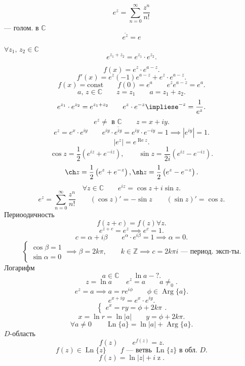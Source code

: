 \lec
\[
e^z= \sum_{n=0}^{\infty} \frac{z^n}{n!}
\]
--- голом. в $\mathbb{C}$
 \[
\overline{e^z}= e 
\]
\begin{thm}
	$\forall z_1,\, z_2 \in \mathbb{C}$ 
	\[
	e ^{z_1 + z_2}= e^{ z_1}\cdot e^{z_2}
	.\] 
\end{thm}
\[
	f(x)=e^{z}\cdot e^{a-z}
.\] 
\[
	f'(x)=e^{z}(-1) e^{a-z}+e^{z}\cdot e^{a-z}
.\] 
\[
	f(x)= \text{const} \qquad f(0)= e^a \qquad e^z e ^{a-z}=e^{a}
.\] 
\[
	a,\,z \in \mathbb{C} \qquad z=z_1 \qquad a=z_1+z_2
.\]
\[
e^{z_1} \cdot e^{z_2}= e ^{z_1 +z_2} \qquad e^{ z}\cdot e^{-z} \impliese ^{-z} = \frac{1}{e^{z}}
.\] 
\[
e^{z} \neq \text{ в } \mathbb{C} \qquad z=x+i y 
.\] 
\[
e ^{z}= e ^{ x} \cdot e ^{iy} \qquad e^{iy} \cdot \overline{e^{iy}}= e ^{iy} \cdot e  ^{-iy}=1 \implies |e ^{iy}|=1
.\] 
\[
	|e ^{z}|= e ^{\operatorname{Re} z}
.\] 
\[
	\cos z = \frac{1}{2} \left( e ^{iz}+ e ^{ -iz} \right) , \qquad \sin z = \frac{1}{2i} \left( e ^{iz}- e ^{-iz} \right) 
.\] 
\[
	\ch z= \frac{1}{2}\left( e ^{z}+e ^{-z} \right) , \sh z= \frac{1}{2}\left(e ^{z}- e^{-z}\right)
.\] 
\[
	\forall z \in \mathbb{C} \qquad e^{iz}= \cos z + i \sin z
.\] 
\[
	e^{z}= \sum_{n=0}^{\infty} \frac{z^n}{n!}\qquad (\cos z)'= -\sin z\qquad (\sin z )'= \cos z
.\] 
Периоодичность
\[
	f(z+c)= f(z) \forall z
.\] 
\[
e^{z+c}= e^{ z} \implies e ^{c}=1
.\] 
\[
c= \alpha +i \beta \qquad e ^{\alpha} \cdot e ^{i\beta}=1\implies \alpha=0
.\] 
\[
\left\{
\begin{aligned}
\cos \beta = 1 \\
\sin \alpha = 0
\end{aligned}
\right.\implies
\beta= 2 k \pi, \qquad k \in \mathbb{Z}\implies c = 2k \pi i \text{ --- период. эксп-ты}
.\] 
Логарифм
\[
	a \in  \mathbb{C} \qquad \ln a - ?
.\] 
\[
z= \ln a \qquad e ^{z}=a \qquad a\neq_0
.\] 
\[
	e^{z}=a \implies a = r e^{i \phi} \qquad \phi \in  \operatorname{Arg} \{a\} 
.\] 
\[
e ^{ x+i y}= e^{x} \cdot e ^{i y}
.\] 
\[
\left\{
\begin{aligned}
e ^{x}=r
y = \phi+ 2k \pi
\end{aligned}
\right.
.\] 
\[
x = \ln r= \ln |a| \qquad y = \phi + 2k \pi
.\] 
\[
	\forall a \neq 0 \qquad \operatorname{Ln} \{a\} = \ln |a| + \operatorname{Arg} \{a\} 
.\]
$D$-область
\[
	f(z) \qquad e^{f(z)}=z
.\] 
\[
f(z) \in \operatorname{Ln} \{z\} \qquad f \text{ --- ветвь } \operatorname{Ln} \{z\} \text{ в обл. } D
.\] 
\[
	f(z)= \ln |z| + i \operatorname{z}
.\] 
\begin{figure}[ht]
    \centering
    \caption{}
    \label{fig:3}
\end{figure}
